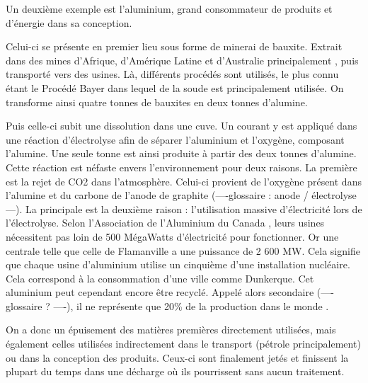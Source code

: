 \medbreak Un deuxième exemple est l'aluminium, grand consommateur de produits et d’énergie dans sa conception.

Celui-ci se présente en premier lieu sous forme de minerai de bauxite. Extrait dans des mines d'Afrique, d'Amérique Latine et d'Australie principalement \cite{aluZonesExtraction}, puis transporté vers des usines. Là, différents procédés sont utilisés, le plus connu étant le Procédé Bayer dans lequel de la soude est principalement utilisée. On transforme ainsi quatre tonnes de bauxites en deux tonnes d'alumine. 

Puis celle-ci subit une dissolution dans une cuve. Un courant y est appliqué dans une réaction d'électrolyse afin de séparer l'aluminium et l'oxygène, composant l'alumine. Une seule tonne est ainsi produite à partir des deux tonnes d'alumine. Cette réaction est néfaste envers l'environnement pour deux raisons. La première est la rejet de CO2 dans l'atmosphère. Celui-ci provient de l'oxygène présent dans l'alumine et du carbone de l'anode de graphite (----glossaire : anode / électrolyse ---). La principale est la deuxième raison : l'utilisation massive d’électricité lors de l'électrolyse. Selon l'Association de l'Aluminium du Canada \cite{consomUsinesAlu}, leurs usines nécessitent pas loin de 500 MégaWatts d’électricité pour fonctionner. Or une centrale telle que celle de Flamanville a une puissance de 2 600 MW. Cela signifie que chaque usine d'aluminium utilise un cinquième d'une installation nucléaire. Cela correspond à la consommation d'une ville comme Dunkerque.
Cet aluminium peut cependant encore être recyclé. Appelé alors secondaire (----glossaire ? ----), il ne représente que 20\% de la production dans le monde \cite{worldAluProdRecycl}. 

\bigbreak On a donc un épuisement des matières premières directement utilisées, mais également celles utilisées indirectement dans le transport (pétrole principalement) ou dans la conception des produits. Ceux-ci sont finalement jetés et finissent la plupart du temps dans une décharge où ils pourrissent sans aucun traitement.


